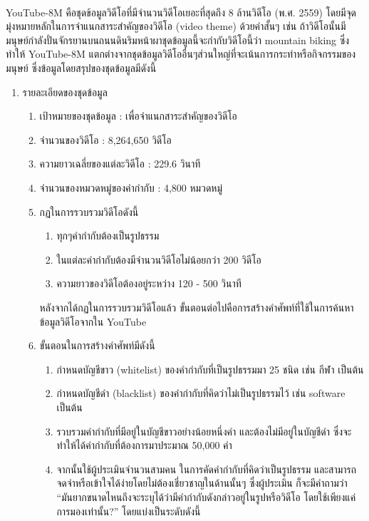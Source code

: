 YouTube-8M\textsuperscript{\cite{abu2016youtube}} คือชุดข้อมูลวิดีโอที่มีจำนวนวิดีโอเยอะที่สุดถึง 8 ล้านวิดีโอ (พ.ศ. 2559) โดยมีจุดมุ่งหมายหลักในการจำแนกสาระสำคัญของวิดีโอ (video theme) 
ด้วยคำสั้นๆ เช่น ถ้าวิดีโอนั้นมีมนุษย์กำลังปั่นจักรยานบนถนนดินริมหน้าผาชุดข้อมูลนี้จะกำกับวิดีโอนี้ว่า mountain biking ซึ่งทำให้ YouTube-8M 
แตกต่างจากชุดข้อมูลวิดีโออื่นๆส่วนใหญ่ที่จะเน้นการกระทำหรือกิจกรรมของมนุษย์ ซึ่งข้อมูลโดยสรุปของชุดข้อมูลมีดังนี้
\begin{enumerate}
	\item {รายละเอียดของชุดข้อมูล}
	\begin{enumerate}
		\setlength\itemsep{-0.25em}
		\item เป้าหมายของชุดข้อมูล : เพื่อจำแนกสาระสำคัญของวิดีโอ
		\item จำนวนของวิดีโอ : 8,264,650 วิดีโอ
		\item ความยาวเฉลี่ยของแต่ละวิดีโอ : 229.6 วินาที
		\item จำนวนของหมวดหมู่ของคำกำกับ : 4,800 หมวดหมู่
		\item กฏในการรวบรวมวิดีโอดังนี้
		\begin{enumerate}
			\setlength\itemsep{-0.25em}
			\item ทุกๆคำกำกับต้องเป็นรูปธรรม
			\item ในแต่ละคำกำกับต้องมีจำนวนวิดีโอไม่น้อยกว่า 200 วิดีโอ
			\item ความยาวของวิดีโอต้องอยู่ระหว่าง 120 - 500 วินาที
		\end{enumerate}
		หลังจากได้กฏในการรวบรวมวิดีโอแล้ว ขั้นตอนต่อไปคือการสร้างคำศัพท์ที่ใช้ในการค้นหาข้อมูลวิดีโอจากใน YouTube 
		\item ขั้นตอนในการสร้างคำศัพท์มีดังนี้
		\begin{enumerate}
			\setlength\itemsep{-0.25em}
			\item กำหนดบัญชีขาว (whitelist) ของคำกำกับที่เป็นรูปธรรมมา 25 ชนิด เช่น กีฬา เป็นต้น
			\item กำหนดบัญชีดำ (blacklist) ของคำกำกับที่คิดว่าไม่เป็นรูปธรรมไว้ เช่น software เป็นต้น
			\item รวบรวมคำกำกับที่มีอยู่ในบัญชีขาวอย่างน้อยหนึ่งคำ และต้องไม่มีอยู่ในบัญชีดำ ซึ่งจะทำให้ได้คำกำกับที่ต้องการมาประมาณ 50,000 คำ
			\item จากนั้นใช้ผู้ประเมินจำนวนสามคน ในการคัดคำกำกับที่คิดว่าเป็นรูปธรรม และสามารถจดจำหรือเข้าใจได้ง่ายโดยไม่ต้องเชี่ยวชาญในด้านนั้นๆ 
			ซึ่งผู้ประเมิน ก็จะมีคำถามว่า “มันยากขนาดไหนถึงจะระบุได้ว่ามีคำกำกับดังกล่าวอยู่ในรูปหรือวิดีโอ โดยใช้เพียงแค่การมองเท่านั้น?” โดยแบ่งเป็นระดับดังนี้
			\begin{enumerate}

\end{enumerate}
\end{enumerate}
\end{enumerate}
\end{enumerate}
